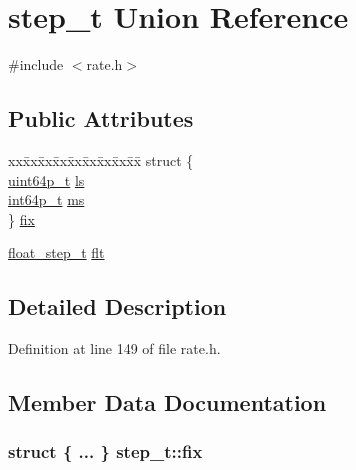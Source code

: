 \hypertarget{unionstep__t}{}\section{step\+\_\+t Union Reference}
\label{unionstep__t}


{\ttfamily \#include $<$rate.\+h$>$}

\subsection*{Public Attributes}
\begin{DoxyCompactItemize}
\item 
\begin{tabbing}
xx\=xx\=xx\=xx\=xx\=xx\=xx\=xx\=xx\=\kill
struct \{\\
\>\hyperlink{unionuint64p__t}{uint64p\_t} \hyperlink{unionstep__t_ad1babcdbc3f7c67b776f8a8b1169ee9d}{ls}\\
\>\hyperlink{unionint64p__t}{int64p\_t} \hyperlink{unionstep__t_a1d04e8601be9e3f539a6eccb17252df4}{ms}\\
\} \hyperlink{unionstep__t_ae2ec9e44f938c6090da65740d4d48045}{fix}\\

\end{tabbing}\item 
\hyperlink{rate_8h_ab8d52bb00a7a6ade606e9b28c1286665}{float\+\_\+step\+\_\+t} \hyperlink{unionstep__t_af6633db2342cac0011856763d47f1844}{flt}
\end{DoxyCompactItemize}


\subsection{Detailed Description}


Definition at line 149 of file rate.\+h.



\subsection{Member Data Documentation}
\subsubsection[{\texorpdfstring{fix}{fix}}]{\setlength{\rightskip}{0pt plus 5cm}struct \{ ... \}   step\+\_\+t\+::fix}\hypertarget{unionstep__t_ae2ec9e44f938c6090da65740d4d48045}{}\label{unionstep__t_ae2ec9e44f938c6090da65740d4d48045}
